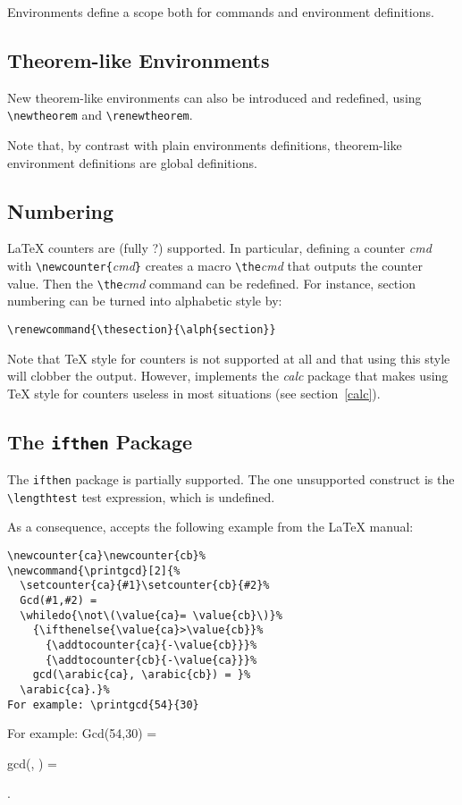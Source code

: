 Environments define a scope both for commands and environment
definitions.


\subsection{Theorem-like Environments}
New theorem-like environments can also be introduced and redefined,
using \verb+\newtheorem+ and \verb+\renewtheorem+.

Note that, by contrast with plain environments definitions,
theorem-like environment definitions are global definitions.

\subsection{Numbering}
\LaTeX{} counters are (fully ?) supported.
In particular, defining a counter \textit{cmd} with
\verb+\newcounter{+\textit{cmd}\verb+}+ creates a macro
\verb+\the+\textit{cmd} that outputs the counter value.
Then the \verb+\the+\textit{cmd} command can be redefined.
For instance, section numbering can be turned into alphabetic style by:
\begin{verbatim}
\renewcommand{\thesection}{\alph{section}}
\end{verbatim}

Note that \TeX{} style for counters is not supported at all and that using
this style will clobber the output. However, \hevea{} implements
the \textit{calc} package that makes using \TeX{} style for counters
useless in most situations (see section~\ref{calc}).


\subsection{The \texttt{ifthen} Package}\label{ifthen}
The \texttt{ifthen} package is partially supported.
The one unsupported construct is the
\verb+\lengthtest+ test expression, which is
undefined.

As a consequence, \hevea{} accepts the following example from the
\LaTeX{} manual:
\begin{verbatim}
\newcounter{ca}\newcounter{cb}%
\newcommand{\printgcd}[2]{%
  \setcounter{ca}{#1}\setcounter{cb}{#2}%
  Gcd(#1,#2) =
  \whiledo{\not\(\value{ca}= \value{cb}\)}%
    {\ifthenelse{\value{ca}>\value{cb}}%
      {\addtocounter{ca}{-\value{cb}}}%
      {\addtocounter{cb}{-\value{ca}}}%
    gcd(\arabic{ca}, \arabic{cb}) = }%
  \arabic{ca}.}%
For example: \printgcd{54}{30}
\end{verbatim}
%
\newcommand{\printgcd}[2]{%
  \setcounter{ca}{#1}\setcounter{cb}{#2}%
  Gcd(#1,#2) =
  \whiledo{\not\(\value{ca}= \value{cb}\)}%
    {\ifthenelse{\value{ca}>\value{cb}}%
      {\addtocounter{ca}{-\value{cb}}}%
      {\addtocounter{cb}{-\value{ca}}}%
    gcd(\arabic{ca}, ) = }%
  .}%
For example: \printgcd{54}{30}

